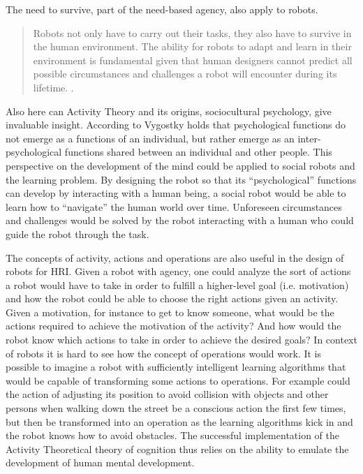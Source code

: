 The need to survive, part of the need-based agency, also apply to robots.
\begin{quote}
Robots not only have to carry out their tasks, they also have
to survive in the human environment. The ability for robots to adapt and learn in their environment is fundamental given that human designers cannot predict all possible circumstances and challenges a robot will encounter during its lifetime. \parencite[][183]{Breazeal2004robot}.
\end{quote}
Also here can Activity Theory and its origins, sociocultural psychology, give invaluable insight. According to \textcite{Kaptelinin2012} Vygostky holds that psychological functions do not emerge as a functions of an individual, but rather emerge as an inter-psychological functions shared between an individual and other people. This perspective on the development of the mind could be applied to social robots and the learning problem. By designing the robot so that its ``psychological'' functions can develop by interacting  with a human being, a social robot would be able to learn how to ``navigate'' the human world over time. Unforeseen circumstances and challenges would be solved by the robot interacting with a human who could guide the robot through the task.

The concepts of activity, actions and operations are also useful in the design of robots for HRI. Given a robot with agency, one could analyze the sort of actions a robot would have to take in order to fulfill a higher-level goal (i.e. motivation) and how the robot could be able to choose the right actions given an activity. Given a motivation, for instance to get to know someone, what would be the actions required to achieve the motivation of the activity? And how would the robot know which actions to take in order to achieve the desired goals? In context of robots it is hard to see how the concept of operations would work. It is possible to imagine a robot with sufficiently intelligent learning algorithms that would be capable of transforming some actions to operations. For example could the action of adjusting its position to avoid collision with objects and other persons when walking down the street be a conscious action the first few times, but then be transformed into an operation as the learning algorithms kick in and the robot knows how to avoid obstacles. The successful implementation of the Activity Theoretical theory of cognition thus relies on the ability to emulate the development of human mental development.



